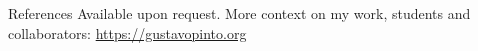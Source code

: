 \begin{rubric}{References}
\entry*
  Available upon request. More context on my work, students and collaborators:
  \url{https://gustavopinto.org}
\end{rubric}
